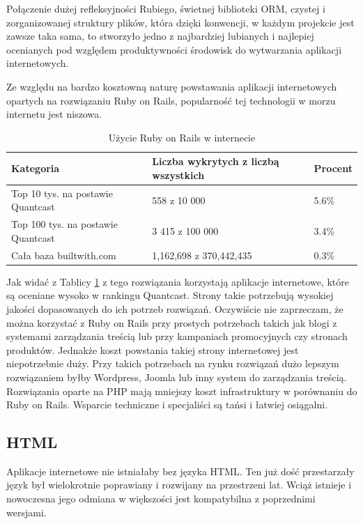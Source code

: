 
Połączenie dużej refleksyjności Rubiego, świetnej biblioteki ORM, czystej i zorganizowanej struktury plików, która dzięki konwencji, w każdym projekcie jest zawsze taka sama, to stworzyło jedno z najbardziej lubianych i najlepiej ocenianych pod względem produktywności środowisk do wytwarzania aplikacji internetowych.

Ze względu na bardzo kosztowną naturę powstawania aplikacji internetowych opartych na rozwiązaniu Ruby on Rails, popularność tej technologii w morzu internetu jest niszowa.\cite{TrendsBuiltWithRails}

\begin{table}
\caption{Użycie Ruby on Rails w internecie}
\label{table:rubyusage}
\begin{tabular}{ |l|l|l|  }
\hline
Kategoria & Liczba wykrytych z liczbą wszystkich & Procent \\
\hline
\hline
Top 10 tys. na postawie Quantcast & 558 z 10 000 & 5.6\% \\
\hline
Top 100 tys. na postawie Quantcast & 3 415 z 100 000 & 3.4\% \\
\hline
Cała baza builtwith.com & 1,162,698 z 370,442,435 & 0.3\% \\
\hline
\end{tabular}
\end{table}

Jak widać z Tablicy \ref{table:rubyusage} z tego rozwiązania korzystają aplikacje internetowe, które są oceniane wysoko w rankingu Quantcast. Strony takie potrzebują wysokiej jakości dopasowanych do ich potrzeb rozwiązań. Oczywiście nie zaprzeczam, że można korzystać z Ruby on Rails przy prostych potrzebach takich jak blogi z systemami zarządzania treścią lub przy kampaniach promocyjnych czy stronach produktów. Jednakże koszt powstania takiej strony internetowej jest niepotrzebnie duży. Przy takich potrzebach na rynku rozwiązań dużo lepszym rozwiązaniem byłby Wordpress, Joomla lub inny system do zarządzania treścią. Rozwiązania oparte na PHP mają mniejszy koszt infrastruktury w porównaniu do Ruby on Rails. Wsparcie techniczne i specjaliści są tańsi i łatwiej osiągalni.

\subsection{HTML}
Aplikacje internetowe nie istniałaby bez języka HTML. Ten już dość przestarzały język był wielokrotnie poprawiany i rozwijany na przestrzeni lat. Wciąż istnieje i nowoczesna jego odmiana w większości jest kompatybilna z poprzednimi wersjami.

